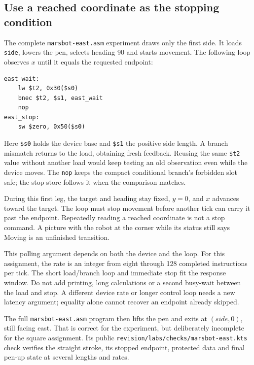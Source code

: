 \subsection*{Use a reached coordinate as the stopping condition}

The complete \texttt{marsbot-east.asm} experiment draws only the first side.
It loads \texttt{side}, lowers the pen, selects heading 90 and starts movement.
The following loop observes $x$ until it equals the requested endpoint:

\noindent\begin{minipage}{\linewidth}
  \begin{verbatim}
east_wait:
    lw $t2, 0x30($s0)
    bnec $t2, $s1, east_wait
    nop
east_stop:
    sw $zero, 0x50($s0)
\end{verbatim}
\end{minipage}

Here \texttt{\$s0} holds the device base and \texttt{\$s1} the positive side
length. A branch mismatch returns to the load, obtaining fresh feedback. Reusing
the same \texttt{\$t2} value without another load would keep testing an old
observation even while the device moves. The \texttt{nop} keeps the compact
conditional branch's forbidden slot safe; the stop store follows it when the
comparison matches.

\begin{samepage}
  During this first leg, the target and heading stay fixed, $y=0$, and $x$ advances
  toward the target. The loop must stop movement before another tick can carry it
  past the endpoint. Repeatedly reading a reached coordinate is not a stop command.
  A picture with the robot at the corner while its status still says Moving is an
  unfinished transition.\par
\end{samepage}

This polling argument depends on both the device and the loop. For this
assignment, the rate is an integer from eight through 128 completed instructions
per tick. The short load/branch loop and immediate stop fit the response window.
Do not add printing, long calculations or a second busy-wait between the load
and stop. A different device rate or longer control loop needs a new latency
argument; equality alone cannot recover an endpoint already skipped.

\begin{samepage}
  The full \texttt{marsbot-east.asm} program then lifts the pen and exits at
  $(side,0)$, still facing east. That is correct for the experiment, but deliberately
  incomplete for the square assignment. Its public
  \texttt{revision/labs/checks/marsbot-east.kts} check verifies the straight stroke,
  its stopped endpoint, protected data and final pen-up state at several lengths
  and rates.\par
\end{samepage}

